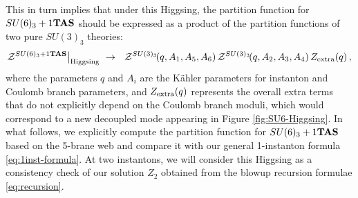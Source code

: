 \documentclass[letterpaper, 11pt]{article}
\def\CZ{{\cal Z}}
\begin{document}
{%
This in turn implies that under this Higgsing, the partition function for $SU(6)_{3}+1{\bf TAS}$ should be expressed as a product of the partition functions of two pure $SU(3)_3$ theories:
\begin{align}
\CZ^{SU(6)_{3}+1{\bf TAS}}\big|_{\rm Higgsing}~\rightarrow ~~ \CZ^{SU(3)_{3}}\!(q,A_1, A_5,A_6)\,\CZ^{SU(3)_{3}}\!(q,A_2, A_3,A_4)\,Z_{\rm extra}(q)\,,
\label{eq:SU6-Higgs-SU3}	
\end{align}
where the parameters $q$ and $A_i$ are the K\"ahler parameters for instanton and Coulomb branch parameters, and  $Z_{\rm extra}(q)$ represents the overall extra terms that do not explicitly depend on the Coulomb branch moduli, which would correspond to a new decoupled mode appearing in Figure \ref{fig:SU6-Higgsing}.  In what follows, we explicitly compute the partition function for $SU(6)_3+1{\bf TAS}$ based on the 5-brane web and compare it with our general 1-instanton formula \eqref{eq:1inst-formula}. At two instantons, we will consider this Higgsing as a consistency check of our solution $Z_2$ obtained from the blowup recursion formulae \eqref{eq:recursion}.

}
\end{document}
